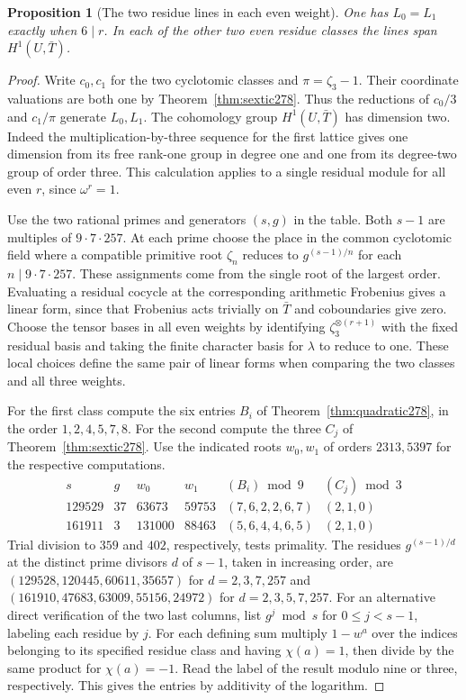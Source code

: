 \documentclass[a4paper,11pt]{article}
\newtheorem{proposition}{Proposition}[section]
\theoremstyle{definition}
\theoremstyle{remark}
\numberwithin{equation}{section}
\begin{document}
\begin{proposition}[The two residue lines in each even weight]\leavevmode
\label{prop:lines279}
One has \(L_0=L_1\) exactly when \(6\mid r\).
In each of the other two even residue classes the lines
span \(H^1(U,\bar T)\).
\end{proposition}
\begin{proof}
Write \(c_0,c_1\) for the two cyclotomic classes and
\(\pi=\zeta_3-1\). Their coordinate valuations are both
one by Theorem~\ref{thm:sextic278}. Thus the reductions of
\(c_0/3\) and \(c_1/\pi\) generate \(L_0,L_1\).
The cohomology group \(H^1(U,\bar T)\) has dimension two.
Indeed the multiplication-by-three sequence for the first
lattice gives one dimension from its free rank-one group in
degree one and one from its degree-two group of order three.
This calculation applies to a single residual module for all
even \(r\), since \(\omega^r=1\).

Use the two rational primes and generators \((s,g)\) in the
table. Both \(s-1\) are multiples of \(9\cdot7\cdot257\).
At each prime choose the place in the common cyclotomic
field where a compatible primitive root \(\zeta_n\) reduces to
\(g^{(s-1)/n}\) for each \(n\mid9\cdot7\cdot257\).
These assignments come from the single root of the largest
order. Evaluating a residual cocycle at the corresponding
arithmetic Frobenius gives a linear form, since that Frobenius
acts trivially on \(\bar T\) and coboundaries give zero.
Choose the tensor bases in all even weights by identifying
\(\zeta_3^{\otimes(r+1)}\) with the fixed residual basis
and taking the finite character basis for \(\lambda\) to reduce to one.
These local choices define the same pair of linear forms when
comparing the two classes and all three weights.

For the first class compute the six entries \(B_i\) of
Theorem~\ref{thm:quadratic278}, in the order \(1,2,4,5,7,8\).
For the second compute the three \(C_j\) of
Theorem~\ref{thm:sextic278}. Use the indicated roots \(w_0,w_1\)
of orders \(2313,5397\) for the respective computations.
\[
\begin{array}{r|r|r|r|c|c}
 s&g&w_0&w_1&(B_i)\bmod9&(C_j)\bmod3\\ \hline
 129529&37&63673&59753&(7,6,2,2,6,7)&(2,1,0)\\
 161911&3&131000&88463&(5,6,4,4,6,5)&(2,1,0)
\end{array}
\]
Trial division to \(359\) and \(402\), respectively, tests
primality. The residues \(g^{(s-1)/d}\) at the distinct prime
divisors \(d\) of \(s-1\), taken in increasing order, are
\((129528,120445,60611,35657)\) for \(d=2,3,7,257\) and
\((161910,47683,63009,55156,24972)\) for \(d=2,3,5,7,257\).
For an alternative direct verification of the two last columns,
list \(g^j\bmod s\) for \(0\le j<s-1\), labeling each residue
by \(j\). For each defining sum multiply \(1-w^a\) over the
indices belonging to its specified residue class and having
\(\chi(a)=1\), then divide by the same product for \(\chi(a)=-1\).
Read the label of the result modulo nine or three, respectively.
This gives the entries by additivity of the logarithm.


\end{proof}
\end{document}
